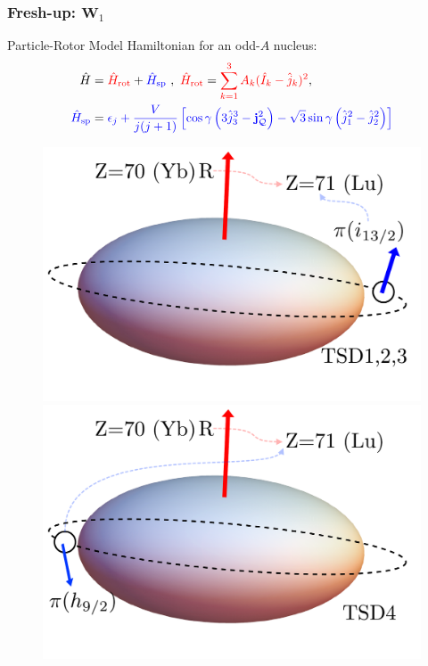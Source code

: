 \documentclass{beamer}
\begin{document}
\begin{frame}
	\frametitle{Fresh-up: $\mathbf{W}_1$}
	Particle-Rotor Model Hamiltonian for an odd-$A$ nucleus:	
	\begin{alignat*}{2}
		\hat{H}&={\color{red}\hat{H}_\text{rot}}+{\color{blue}\hat{H}_\text{sp}}\ ,\ {\color{red}\hat{H}_\text{rot}}={\color{red}\sum_{k=1}^3A_k(\hat{I}_k-\hat{j}_k)^2},\\
		{\color{blue}\hat{H}_\text{sp}}&={\color{blue}\epsilon_j+\frac{V}{j(j+1)}\left[\cos\gamma\left(3\hat{j}_3^3-\mathbf{j}_\mathcal{Q}^2\right)-\sqrt{3}\sin\gamma\left(\hat{j}_1^2-\hat{j}_2^2\right)\right]}
	\end{alignat*}
	\vspace{-0.4cm}
	\begin{figure}
		\centering
		\includegraphics[scale=0.22]{figures/triaxial-shapes-oddA-1.pdf}
		\includegraphics[scale=0.22]{figures/triaxial-shapes-oddA-2.pdf}
	\end{figure}
\end{frame}
\end{document}
